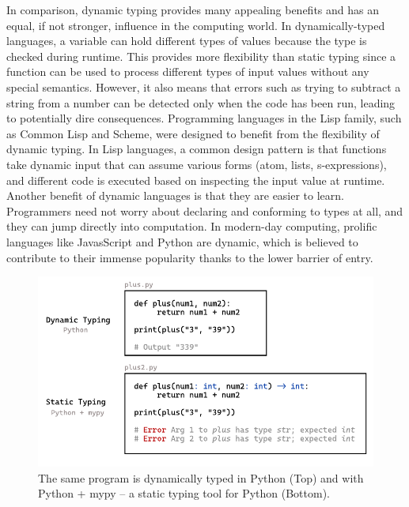 In comparison, dynamic typing provides many appealing benefits and has an equal, if not stronger, influence in the computing world. In dynamically-typed languages, a variable can hold different types of values because the type is checked during runtime. This provides more flexibility than static typing since a function can be used to process different types of input values without any special semantics. However, it also means that errors such as trying to subtract a string from a number can be detected only when the code has been run, leading to potentially dire consequences. Programming languages in the Lisp family, such as Common Lisp and Scheme, were designed to benefit from the flexibility of dynamic typing. In Lisp languages, a common design pattern is that functions take dynamic input that can assume various forms (atom, lists, s-expressions), and different code is executed based on inspecting the input value at runtime. Another benefit of dynamic languages is that they are easier to learn. Programmers need not worry about declaring and conforming to types at all, and they can jump directly into computation. In modern-day computing, prolific languages like JavasScript and Python are dynamic, which is believed to contribute to their immense popularity thanks to the lower barrier of entry.

\begin{figure}[hbt]
  \includegraphics[width=\linewidth]{TypedVsUntyped.pdf}
  \caption{
    \label{fig:typed-vs-untyped}
   The same program is dynamically typed in Python (Top) and with Python + mypy -- a static typing tool for Python (Bottom).
    }
\end{figure}

